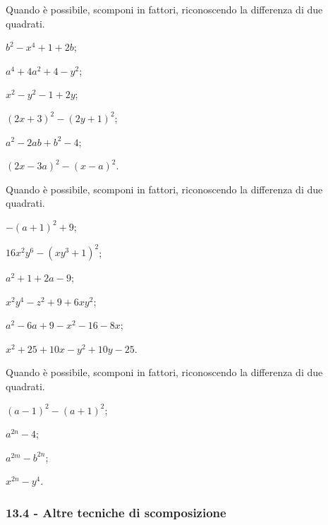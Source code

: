 \begin{esercizio}[\Ast]
\label{ese:13.67}
Quando è possibile, scomponi in fattori, riconoscendo la differenza di due quadrati.
\begin{multicols}{3}
\begin{enumeratea}
 \item $b^{2}-x^{4}+1+2b$;
 \item $a^{4}+4a^{2}+4-y^{2}$;
 \item $x^{2}-y^{2}-1+2y$;
 \item $(2x+3)^{2}-(2y+1)^{2}$;
 \item $a^{2}-2{ab}+b^{2}-4$;
 \item $(2x-3a)^{2}-(x-a)^{2}$.
\end{enumeratea}
\end{multicols}
\end{esercizio}

\begin{esercizio}[\Ast]
\label{ese:13.68}
Quando è possibile, scomponi in fattori, riconoscendo la differenza di due quadrati.
\begin{multicols}{2}
\begin{enumeratea}
 \item $-(a+1)^{2}+9$;
 \item $16x^{2}y^{6}-(xy^{3}+1)^{2}$;
 \item $a^{2}+1+2a-9$;
 \item $x^{2}y^{4}-z^{2}+9+6xy^{2}$;
 \item $a^{2}-6a+9-x^{2}-16-8x$;
 \item $x^{2}+25+10x-y^{2}+10y-25$.
\end{enumeratea}
\end{multicols}
\end{esercizio}

\begin{esercizio}
\label{ese:13.69}
Quando è possibile, scomponi in fattori, riconoscendo la differenza di due quadrati.
\begin{multicols}{2}
\begin{enumeratea}
 \item $(a-1)^{2}-(a+1)^{2}$;
 \item $a^{2n}-4$;
 \item $a^{2m}-b^{2n}$;
 \item $x^{2n}-y^{4}$.
\end{enumeratea}
\end{multicols}
\end{esercizio}

\subsubsection*{13.4 - Altre tecniche di scomposizione}

